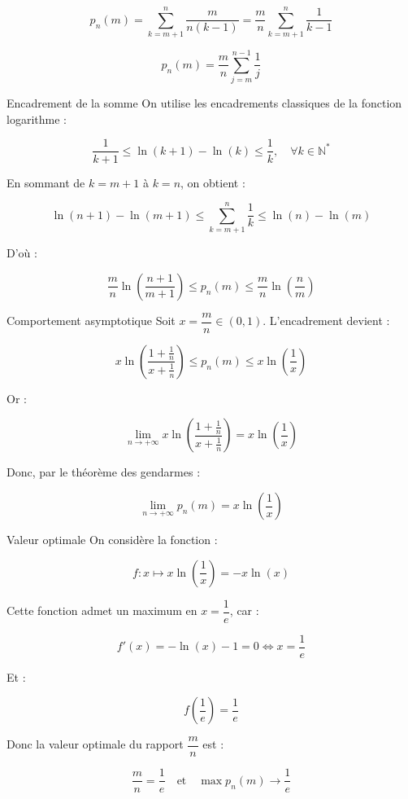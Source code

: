 \documentclass[10pt,a4paper]{article}
\begin{document}
\[
p_n(m) = \sum_{k = m+1}^{n} \dfrac{m}{n(k-1)} = \dfrac{m}{n} \sum_{k = m+1}^{n} \dfrac{1}{k - 1}
\]

\[
\boxed{p_n(m) = \dfrac{m}{n} \sum_{j = m}^{n - 1} \dfrac{1}{j}}
\]


\q Encadrement de la somme
On utilise les encadrements classiques de la fonction logarithme :

\[
\dfrac{1}{k+1} \leq \ln(k+1) - \ln(k) \leq \dfrac{1}{k}, \quad \forall k \in \mathbb{N}^*
\]

En sommant de \( k = m+1 \) à \( k = n \), on obtient :

\[
\ln(n+1) - \ln(m+1) \leq \sum_{k = m+1}^{n} \dfrac{1}{k} \leq \ln(n) - \ln(m)
\]

D'où :

\[
\boxed{
\dfrac{m}{n} \ln\left( \dfrac{n+1}{m+1} \right) \leq p_n(m) \leq \dfrac{m}{n} \ln\left( \dfrac{n}{m} \right)
}
\]


\q Comportement asymptotique
Soit \( x = \dfrac{m}{n} \in (0, 1) \). L'encadrement devient :

\[
x \ln\left( \dfrac{1 + \frac{1}{n}}{x + \frac{1}{n}} \right) \leq p_n(m) \leq x \ln\left( \dfrac{1}{x} \right)
\]

Or :

\[
\lim_{n \to +\infty} x \ln\left( \dfrac{1 + \frac{1}{n}}{x + \frac{1}{n}} \right) = x \ln\left( \dfrac{1}{x} \right)
\]

Donc, par le théorème des gendarmes :

\[
\boxed{\lim_{n \to +\infty} p_n(m) = x \ln\left( \dfrac{1}{x} \right)}
\]


\q Valeur optimale
On considère la fonction :

\[
f : x \mapsto x \ln\left( \dfrac{1}{x} \right) = -x \ln(x)
\]

Cette fonction admet un maximum en \( x = \dfrac{1}{e} \), car :

\[
f'(x) = -\ln(x) - 1 = 0 \iff x = \dfrac{1}{e}
\]

Et :

\[
f\left( \dfrac{1}{e} \right) = \dfrac{1}{e}
\]

Donc la valeur optimale du rapport \( \dfrac{m}{n} \) est :

\[
\boxed{\dfrac{m}{n} = \dfrac{1}{e}} \quad \text{et} \quad \boxed{\max p_n(m) \to \dfrac{1}{e}}
\]
\end{document}
